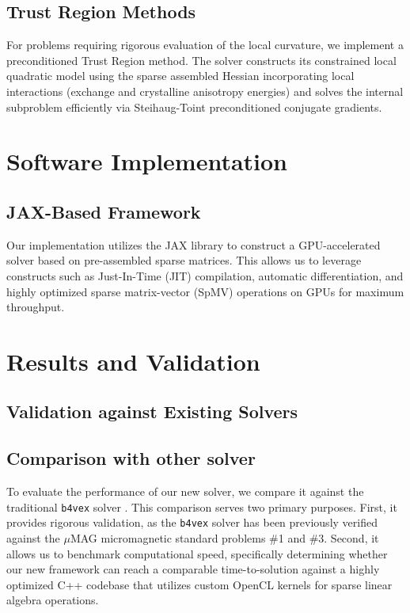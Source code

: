 \documentclass[10pt, a4paper, twocolumn]{article}
\begin{document}
\subsection{Trust Region Methods}
For problems requiring rigorous evaluation of the local curvature, we implement a preconditioned Trust Region method. The solver constructs its constrained local quadratic model using the sparse assembled Hessian incorporating local interactions (exchange and crystalline anisotropy energies) and solves the internal subproblem efficiently via Steihaug-Toint preconditioned conjugate gradients.

\section{Software Implementation}

\subsection{JAX-Based Framework}
Our implementation utilizes the JAX library to construct a GPU-accelerated solver based on pre-assembled sparse matrices. This allows us to leverage constructs such as Just-In-Time (JIT) compilation, automatic differentiation, and highly optimized sparse matrix-vector (SpMV) operations on GPUs for maximum throughput.

\section{Results and Validation}

\subsection{Validation against Existing Solvers}

\subsection{Comparison with other solver}
To evaluate the performance of our new solver, we compare it against the traditional \texttt{b4vex} solver \cite{exl2019preconditioned}. This comparison serves two primary purposes. First, it provides rigorous validation, as the \texttt{b4vex} solver has been previously verified against the $\mu$MAG micromagnetic standard problems \#1 and \#3. Second, it allows us to benchmark computational speed, specifically determining whether our new framework can reach a comparable time-to-solution against a highly optimized C++ codebase that utilizes custom OpenCL kernels for sparse linear algebra operations.
\end{document}
